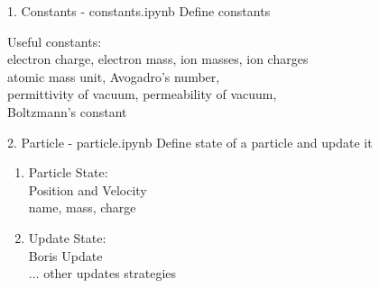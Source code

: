 \documentclass{beamer}
\begin{document}
	\begin{frame}[t]{1. Constants - constants.ipynb}
		Define constants
		
		Useful constants: \\
		\hspace{0.5cm} electron charge, electron mass, ion masses, ion charges \\ \hspace{0.5cm} atomic mass unit, Avogadro's number, \\ \hspace{0.5cm} permittivity of vacuum,  permeability of vacuum, \\ \hspace{0.5cm} Boltzmann's constant
	\end{frame}
	\begin{frame}[t]{2. Particle - particle.ipynb}
		Define state of a particle and update it \\
		\vspace{1cm}
		\begin{enumerate}
			\item Particle State: \\
			Position and Velocity \\
			name, mass, charge
			\item Update State: \\
			Boris Update \\
			... other updates strategies
		\end{enumerate}
	\end{frame}
	
	\begin{frame}
		
	\end{frame}
	\begin{frame}
		
	\end{frame}
\end{document}
